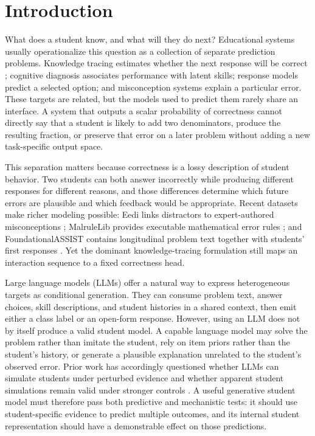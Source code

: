 \section{Introduction}
\label{sec:introduction}

What does a student know, and what will they do next?  Educational systems
usually operationalize this question as a collection of separate prediction
problems.  Knowledge tracing estimates whether the next response will be
correct \citep{corbett1995knowledge,piech2015deep,ghosh2020context}; cognitive
diagnosis associates performance with latent skills; response models predict
a selected option; and misconception systems explain a particular error.
These targets are related, but the models used to predict them rarely share an
interface.  A system that outputs a scalar probability of correctness cannot
directly say that a student is likely to add two denominators, produce the
resulting fraction, or preserve that error on a later problem without adding a
new task-specific output space.

This separation matters because correctness is a lossy description of student
behavior.  Two students can both answer incorrectly while producing different
responses for different reasons, and those differences determine which future
errors are plausible and which feedback would be appropriate.  Recent datasets
make richer modeling possible: Eedi links distractors to expert-authored
misconceptions \citep{wang2021diagnostic}; MalruleLib provides executable
mathematical error rules \citep{chen2026malrulelib}; and FoundationalASSIST
contains longitudinal problem text together with students' first responses
\citep{worden2026foundationalassist}.  Yet the dominant knowledge-tracing
formulation still maps an interaction sequence to a fixed correctness head.

Large language models (LLMs) offer a natural way to express heterogeneous
targets as conditional generation.  They can consume problem text, answer
choices, skill descriptions, and student histories in a shared context, then
emit either a class label or an open-form response.  However, using an LLM does
not by itself produce a valid student model.  A capable language model may
solve the problem rather than imitate the student, rely on item priors rather
than the student's history, or generate a plausible explanation unrelated to
the student's observed error.  Prior work has accordingly questioned whether
LLMs can simulate students under perturbed evidence \citep{sonkar2023deduction}
and whether apparent student simulations remain valid under stronger controls
\citep{yuan2026valid}.  A useful generative student model must therefore pass
both predictive and mechanistic tests: it should use student-specific evidence
to predict multiple outcomes, and its internal student representation should
have a demonstrable effect on those predictions.

